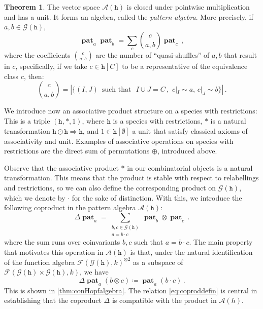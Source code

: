 \documentclass[12pt, reqno]{amsart}
\theoremstyle{definition}
\newtheorem{thm}{Theorem}[section]
\DeclareMathOperator{\pat}{\mathbf{pat}}
\begin{document}
\begin{thm}
The vector space $\mathcal{A}(\mathtt{h})$ is closed under pointwise multiplication and has a unit.
It forms an algebra, called the \textit{pattern algebra}.
More precisely, if $a, b \in \mathcal G(\mathtt{h})$,
\begin{equation}\label{eq:prodrule}
\pat_ a   \pat_b = \sum_c \binom{c}{a, b} \pat_c \, ,
\end{equation}
where the coefficients $\binom{c}{a, b}$ are the number of ``quasi-shuffles'' of $a, b$ that result in $c$, specifically, if we take $c\in \mathtt{h}[C]$ to be a representative of the equivalence class $c$, then:
$$ \binom{c}{a, b} = \left| \{(I, J) \, \text{ such that } \, \,  I \cup J = C \, ,\, \, c|_{I} \sim a, \, c|_{J} \sim b \} \right| \, .  $$
\end{thm} 



We introduce now an associative product structure on a species with restrictions:
This is a triple $(\mathtt{h}, \ast, 1)$, where $\mathtt{h}$ is a species with restrictions, $\ast $ is a natural transformation $\mathtt{h}\odot \mathtt{h} \Rightarrow \mathtt{h}$, and $1 \in \mathtt{h}[\emptyset ] $ a unit that satisfy classical axioms of associativity and unit. 
Examples of associative operations on species with restrictions are the direct sum of permutations $\oplus$, introduced above.

Observe that the associative product $\ast $ in our combinatorial objects is a natural transformation.
This means that the product is stable with respect to relabellings and restrictions, so we can also define the corresponding product on $\mathcal{G}(\mathtt{h})$, which we denote by $\cdot $ for the sake of distinction.
With this, we introduce the following coproduct in the pattern algebra $\mathcal A (\mathtt{h})$:
\begin{equation}\label{eq:coprodformula}
\Delta \pat_ a = \sum_{\substack{ b, c\in \mathcal G (\mathtt{h}) \\ a = b \cdot c}} \pat_b \otimes \pat_c \, .
\end{equation}
where the sum runs over coinvariants $b, c$ such that $a = b \cdot c$.
The main property that motivates this operation in $\mathcal{A}(\mathtt{h})$ is that, under the natural identification of the function algebra $\mathcal{F}(\mathcal G (\mathtt{h}), k)^{\otimes 2} $ as a subspace of $\mathcal{F}(\mathcal G (\mathtt{h}) \times \mathcal G (\mathtt{h}), k) $, we have
\begin{equation}\label{eq:coproddefin}
 \Delta \pat_a (b \otimes  c) \coloneqq  \pat_a (b \cdot c) \, .
\end{equation}
This is shown in \cref{thm:conHopfalgebra}.
The relation \eqref{eq:coproddefin} is central in establishing that the coproduct $\Delta $ is compatible with the product in $\mathcal A (h)$.
\end{document}
